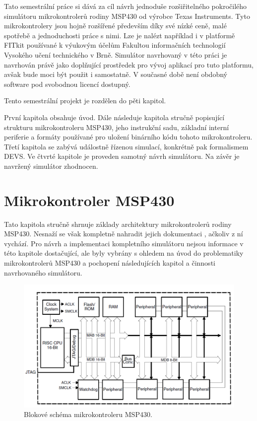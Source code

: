 Tato semestrální práce si dává za cíl návrh jednoduše rozšiřitelného pokročilého simulátoru mikrokontrolerů rodiny MSP430 od výrobce Texas Instruments. Tyto mikrokontrolery jsou hojně rozšířené především díky své nízké ceně, malé spotřebě a jednoduchosti práce s nimi. Lze je nalézt například i v platformě FITkit používané k výukovým účelům Fakultou informačních technologií Vysokého učení technického v Brně. Simulátor navrhovaný v této práci je navrhován právě jako doplňující prostředek pro vývoj aplikací pro tuto platformu, avšak bude moci být použit i samostatně. V současné době není obdobný software pod svobodnou licencí dostupný.

Tento semestrální projekt je rozdělen do pěti kapitol.

První kapitola obsahuje úvod. Dále následuje kapitola stručně popisující strukturu mikrokontroleru MSP430, jeho instrukční sadu, základní interní periferie a formáty používané pro uložení binárního kódu tohoto mikrokontroleru. Třetí kapitola se zabývá událostně řízenou simulací, konkrétně pak formalismem DEVS. Ve čtvrté kapitole je proveden samotný návrh simulátoru. Na závěr je navržený simulátor zhodnocen.



\chapter{Mikrokontroler MSP430}

Tato kapitola stručně shrnuje základy architektury mikrokontrolerů rodiny MSP430. Nesnaží se však kompletně nahradit jejich dokumentaci \cite{msp430family} \cite{msp430book}, ačkoliv z ní vychází. Pro návrh a implementaci kompletního simulátoru nejsou informace v této kapitole dostačující, ale byly vybrány s ohledem na úvod do problematiky mikrokontrolerů MSP430 a pochopení následujících kapitol a činnosti navrhovaného simulátoru.

\begin{figure}[ht]
\centering
\includegraphics[trim=0cm 0cm 0cm 0cm, scale=0.5]{fig/msp430block}
\caption{Blokové schéma mikrokontroleru MSP430.}
\label{fig:msp430block}
\end{figure}

